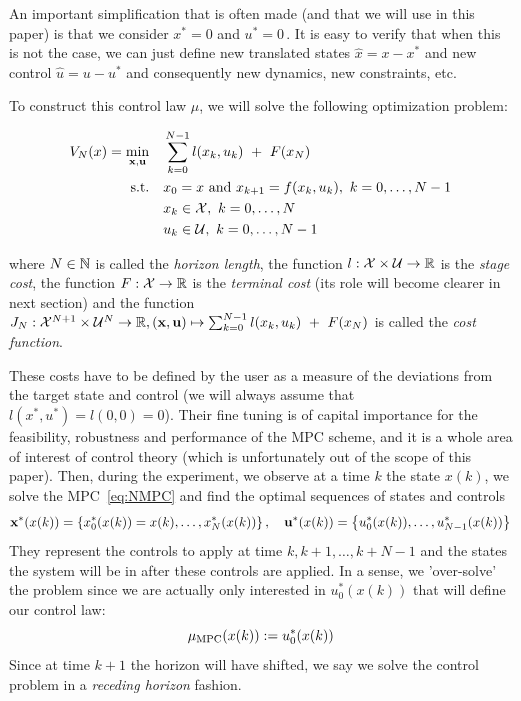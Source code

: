 \documentclass[12pt]{article}
\begin{document}
An important simplification that is often made (and that we will use in this paper) is that we consider $x^*=0$ and $u^*=0$\,.
It is easy to verify that when this is not the case, we can just define new translated states $\hat{x}=x-x^*$ and new control $\hat{u}=u-u^*$ and consequently new dynamics, new constraints, etc.

\noindent To construct this control law $\mu$, we will solve the following optimization problem:

\begin{align}
	\begin{split}
		\label{eq:NMPC}
		V_N(x)=\underset{\bf{x},\bf{u}}{\min} &\quad \sum_{k=0}^{N-1}l(x_k,u_k)~+~F(x_N)\\
		\text{s.t.} &\quad x_0=x\text{ and }x_{k+1}=f(x_k,u_k),~k=0,\ldots,N-1\\
		&\quad x_k\in\cal{X},~k=0,\ldots,N\\
		&\quad u_k\in\cal{U},~k=0,\ldots,N-1
	\end{split}
\end{align}

\noindent where $N\in\N$ is called the \textit{horizon length}, the function $l:\cal{X}\times\cal{U}\to\R$ is the \textit{stage cost}, the function $F:\cal{X}\to\R$ is the \textit{terminal cost} (its role will become clearer in next section) and the function $J_N:\cal{X}^{N+1}\times\cal{U}^N\to\R, (\bf{x},\bf{u})\mapsto\sum_{k=0}^{N-1}l(x_k,u_k)~+~F(x_N)$ is called the \textit{cost function}.

\vspace{12pt}

These costs have to be defined by the user as a measure of the deviations from the target state and control (we will always assume that $l(x^*,u^*)=l(0,0)=0$).
Their fine tuning is of capital importance for the feasibility, robustness and performance of the MPC scheme, and it is a whole area of interest of control theory (which is unfortunately out of the scope of this paper).
Then, during the experiment, we observe at a time $k$ the state $x(k)$, we solve the MPC~\ref{eq:NMPC} and find the optimal sequences of states and controls $$\bf{x}^*(x(k))=\left\{ x_0^*(x(k))=x(k),\ldots,x_N^*(x(k))\right\},\quad \bf{u}^*(x(k))=\left\{ u_0^*(x(k)),\ldots,u_{N-1}^*(x(k))\right\}$$
They represent the controls to apply at time $k,k+1,\ldots,k+N-1$ and the states the system will be in after these controls are applied.
In a sense, we 'over-solve' the problem since we are actually only interested in $u_0^*(x(k))$ that will define our control law:
$$\mu_{\rm{MPC}}(x(k)):=u_0^*(x(k))$$
Since at time $k+1$ the horizon will have shifted, we say we solve the control problem in a \textit{receding horizon} fashion.
\end{document}
